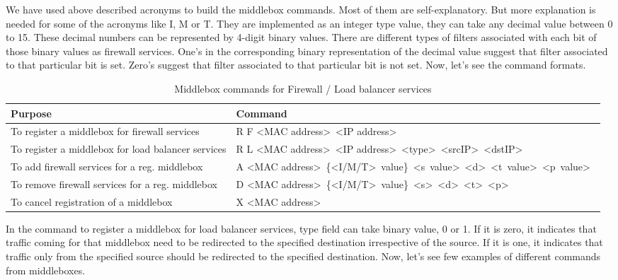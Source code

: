\documentclass[a4paper,11pt]{report}
\begin{document}
We have used above described acronyms to build the middlebox commands. Most of them are self-explanatory. But more explanation is needed for some of the acronyms like I, M or T. They are implemented as an integer type value, they can take any decimal value between 0 to 15. These decimal numbers can be represented by 4-digit binary values. There are different types of filters associated with each bit of those binary values as firewall services. One's in the corresponding binary representation of the decimal value suggest that filter associated to that particular bit is set. Zero's suggest that filter associated to that particular bit is not set. Now, let's see the command formats.           
\begin{table}[H]
\centering
\begin{tabular}{ | C{4.0cm} | L{10.3cm} | }
\hline
{\textbf {Purpose}} & {\textbf {Command}}\\ %
\hline
\hline
{To register a middlebox for firewall services} & {R F \textless MAC address\textgreater\ \textless IP address\textgreater} \\
\hline
{To register a middlebox for load balancer services} & {R L \textless MAC address\textgreater\ \textless IP address\textgreater\ \textless type\textgreater\ \textless srcIP\textgreater\ \textless dstIP\textgreater} \\
\hline
{To add firewall services for a reg. middlebox} & {A \textless MAC address\textgreater\ \{\textless I/M/T\textgreater\ value\}\ \textless s\ value\textgreater\ \textless d\textgreater\ \textless t\ value\textgreater\ \textless p\ value\textgreater\ } \\
\hline
{To remove firewall services for a reg. middlebox} & {D \textless MAC address\textgreater\ \{\textless I/M/T\textgreater\ value\}\ \textless s\textgreater\ \textless d\textgreater\ \textless t\textgreater\ \textless p\textgreater\ } \\
\hline
{To cancel registration of a middlebox} & {X \textless MAC address\textgreater\ } \\
\hline
\end{tabular}
\caption{Middlebox commands for Firewall / Load balancer services}
\end{table}   
In the command to register a middlebox for load balancer services, type field can take binary value, 0 or 1. If it is zero, it indicates that traffic coming for that middlebox need to be redirected to the specified destination irrespective of the source. If it is one, it indicates that traffic only from the specified source should be redirected to the specified destination. Now, let's see few examples of different commands from middleboxes.
\end{document}
